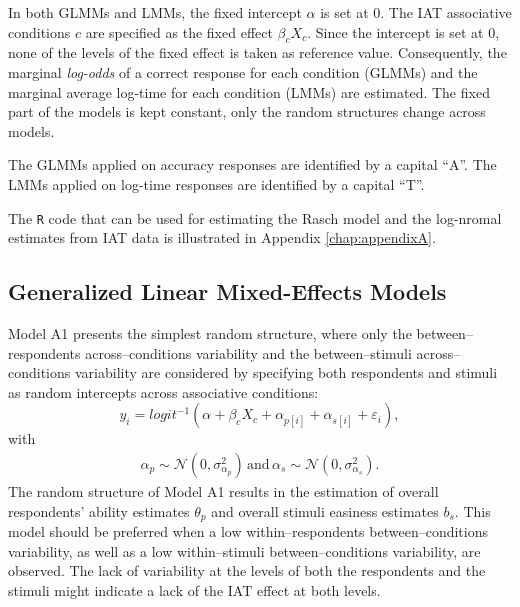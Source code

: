 \documentclass[12pt]{book}
\begin{document}
In both GLMMs and LMMs, the fixed intercept $\alpha$ is set at $0$. The IAT associative conditions $c$ are specified as the fixed effect $\beta_cX_c$. Since the intercept is set at $0$, none of the levels of the fixed effect is taken as reference value. Consequently, the marginal \emph{log-odds} of a correct response for each condition (GLMMs) and the marginal average log-time for each condition (LMMs) are estimated.
The fixed part of the models is kept constant, only the random structures change across models.

The GLMMs applied on accuracy responses are identified by a capital ``A''. The LMMs applied on log-time responses are identified by a capital ``T''. 

The \verb*|R| code that can be used for estimating the Rasch model and the log-nromal estimates from IAT data is illustrated in Appendix \ref{chap:appendixA}.


\subsection[GLMMs]{Generalized Linear Mixed-Effects Models}\label{sec:accuracymodels}

Model A1 presents the simplest random structure, where only the between--respondents across--conditions variability and the between--stimuli across--conditions variability are considered by specifying both respondents and stimuli as random intercepts across associative conditions: 
\begin{equation}\label{AccuracyMin}
	y_{i} = logit^{-1}(\alpha + \beta_cX_c + \alpha_{p[i]} +  \alpha_{s[i]} + \varepsilon_{i}),
\end{equation}
with
\begin{align}
	\alpha_{p} \sim  \mathcal{N} ( 0, \sigma_{\alpha_p}^2) \, \text{and} \, \alpha_{s}  \sim  \mathcal{N} (0,\sigma_{\alpha_s}^2).
\end{align}
The random structure of Model A1 results in the estimation of overall respondents' ability estimates $\theta_{p}$ and overall stimuli easiness estimates $b_s$. This model should be preferred when a low within--respondents between--conditions variability, as well as a low within--stimuli between--conditions variability, are observed. The lack of variability at the levels of both the respondents and the stimuli might indicate a lack of the IAT effect at both levels. 
\end{document}
